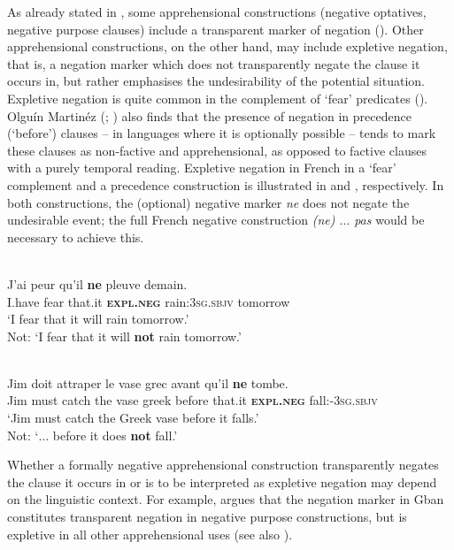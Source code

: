 \documentclass[output=paper,colorlinks,citecolor=brown
]{langscibook}
\begin{document}
As already stated in , some apprehensional constructions (negative optatives, negative purpose clauses) include a transparent marker of negation (\citealt{chapters/wiemer}). Other apprehensional constructions, on the other hand, may include expletive negation, that is, a negation marker which does not transparently negate the clause it occurs in, but rather emphasises the undesirability of the potential situation. Expletive negation is quite common in the complement of `fear' predicates (\cite{jinkoenig2020, dobrushina2021}). Olguín Martinéz (\citeyear[601--602]{olguinmartinez2023a}; \citeyear[16]{olguinmartinez2023b}) also finds that the presence of negation in precedence (`before') clauses -- in languages where it is optionally possible -- tends to mark these clauses as non-factive and apprehensional, as opposed to factive clauses with a purely temporal reading. Expletive negation in French in a `fear' complement and a precedence construction is illustrated in  and , respectively. In both constructions, the (optional) negative marker \textit{ne} does not negate the undesirable event; the full French negative construction \textit{(ne) $\ldots$ pas} would be necessary to achieve this.

\ea 
\label{ex:intro13a}
 \\
\gll J'ai peur qu'il {\op}\textbf{ne}{\cp} pleuve demain. \\
I.have fear that.it \textsc{\textbf{expl.neg}} rain:\textsc{3sg.sbjv} tomorrow\\
\glt `I fear that it will rain tomorrow.'\\
Not: `I fear that it will \textbf{not} rain tomorrow.'\\
\z

\ea 
\label{ex:intro13b}
 \\
\gll Jim doit attraper le vase grec avant qu'il  {\op}\textbf{ne}{\cp} tombe.\\
Jim must catch the vase greek before that.it \textsc{\textbf{expl.neg}} fall:-\textsc{3sg.sbjv} \\
\glt `Jim must catch the Greek vase before it falls.'\\
Not: `$\ldots$ before it does \textbf{not} fall.'
\z


 Whether a formally negative apprehensional construction transparently negates the clause it occurs in or is to be interpreted as expletive negation may depend on the linguistic context. For example, \citet{chapters/fedotov} argues that the negation marker in Gban constitutes transparent negation in negative purpose constructions, but is expletive in all other apprehensional uses (see also ).
\end{document}
